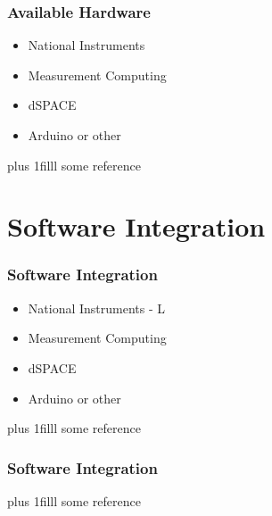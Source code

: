 \documentclass[fleqn]{beamer} %
\newcommand{\sectiontitleIII}{Available Hardware}
\newcommand{\sectiontitleIV}{Software Integration}
\newcommand{\btVFill}{\vskip0pt plus 1filll}
\begin{document}
\begin{frame}[label=sectionIII] \small
\frametitle{\sectiontitleIII}
\bigskip

\begin{itemize}
	\item National Instruments \vspace{6mm}\\
	
	\item Measurement Computing  \vspace{6mm}\\
	
	\item dSPACE  \vspace{6mm}\\
	
	\item Arduino or other 
	
\end{itemize}

\btVFill
\tiny{some reference}		

\end{frame}
	
\section{\sectiontitleIV}	

\begin{frame}[label=sectionIV] \small
\frametitle{\sectiontitleIV}
\bigskip

\begin{itemize}
	\item National Instruments - L \vspace{6mm}\\
	
	\item Measurement Computing  \vspace{6mm}\\
	
	\item dSPACE  \vspace{6mm}\\
	
	\item Arduino or other 
	
\end{itemize}


\btVFill
\tiny{some reference}		

\end{frame}

\begin{frame}[label=sectionIV] \small
\frametitle{\sectiontitleIV}
\bigskip


\btVFill
\tiny{some reference}	
\end{frame}
\end{document}
